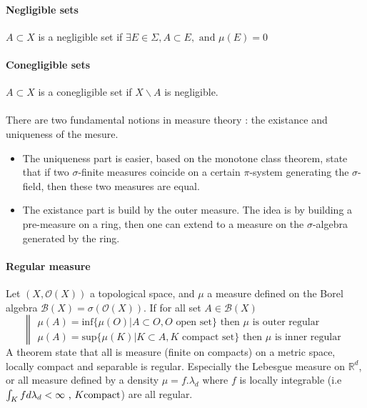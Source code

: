 \documentclass[a4paper,10pt]{article}
\begin{document}
\paragraph{Negligible sets} $A \subset X$ is a negligible set if $\exists E \in \Sigma, A \subset E, \text{ and } \mu(E)=0$
\paragraph{Conegligible sets} $A \subset X$ is a conegligible set if $X \backslash A$ is negligible.

\paragraph{}There are two fundamental notions in measure theory : the existance and uniqueness of the mesure. 
\begin{itemize}
 \item The uniqueness part is easier, based on the monotone class theorem, state that if two $\sigma$-finite measures coincide on a certain $\pi$-system generating the $\sigma$-field, then these two measures are equal.  
 \item The existance part is build by the outer measure. The idea is by building a pre-measure on a ring, then one can extend to a measure on the $\sigma$-algebra generated by the ring. 
\end{itemize}

\paragraph{Regular measure}
Let $(X, \mathcal{O}(X))$ a topological space, and $\mu$ a measure defined on the Borel algebra $\mathcal{B}(X) = \sigma(\mathcal{O}(X))$. If for all set $A \in \mathcal{B}(X)$ 
\[
\left\|
\begin{array}{l}
 \mu(A) = \text{inf}\{\mu(O) | A \subset O, O \text{ open set}\} \text{ then } \mu \text{ is outer regular } \\
 \mu(A) = \text{sup}\{\mu(K) | K \subset A, K \text{ compact set}\} \text{ then } \mu \text{ is inner regular } 
\end{array}
\right.
\]
A theorem state that all is measure (finite on compacts) on a metric space, locally compact and separable is regular. Especially the Lebesgue measure on $\mathbb{R}^d$, or all measure defined by a density $\mu=f.\lambda_d$ where $f$ is locally integrable (i.e $\int_K fd\lambda_d < \infty \hbox{ , } K \text{compact}$) are all regular.
\end{document}
